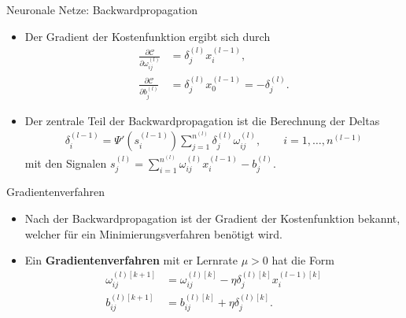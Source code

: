 \begin{frame}{Neuronale Netze: Backwardpropagation}
    \begin{itemize}
        \item<1-> Der Gradient der Kostenfunktion ergibt sich durch
        \begin{align*}
            \frac{\partial \mathcal{C}}{\partial \omega_{ij}^{(l)}} &= \delta_j^{(l)} x_i^{(l-1)}, \\
            \frac{\partial \mathcal{C}}{\partial b_j^{(l)}} &= \delta_j^{(l)} x_{0}^{(l-1)} = -\delta_j^{(l)}.
        \end{align*}
        \item<2-> Der zentrale Teil der Backwardpropagation ist die Berechnung der Deltas
        \begin{align*}
            \delta_i^{(l-1)} = \Psi'(s_i^{(l-1)})\sum\limits_{j=1}^{n^{(l)}} \delta_j^{(l)}\omega_{ij}^{(l)},
            \qquad  i = 1, \dots, n^{(l-1)}
        \end{align*}
        mit den Signalen $s_j^{(l)} = \sum\limits_{i=1}^{n^{(l)}} \omega_{ij}^{(l)} x_i^{(l-1)} - b_j^{(l)}$.
    \end{itemize}
\end{frame}

\begin{frame}{Gradientenverfahren}
    \begin{itemize}
        \item<1-> Nach der Backwardpropagation ist der Gradient der Kostenfunktion bekannt, welcher für ein
        Minimierungsverfahren benötigt wird.
        \item<2-> Ein \textbf{Gradientenverfahren} mit er Lernrate $\mu>0$ hat die Form
        \begin{align*}
            \omega_{ij}^{(l)[k+1]} &= \omega_{ij}^{(l)[k]} - \eta \delta_{j}^{(l)[k]} x_i^{(l-1)[k]}\\
            b_{ij}^{(l)[k+1]} &= b_{ij}^{(l)[k]} + \eta \delta_{j}^{(l)[k]}.
        \end{align*}
    \end{itemize}
\end{frame}


